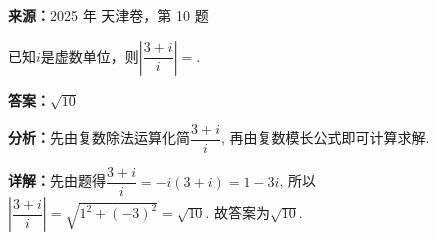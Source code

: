 \begin{question}[points=5]
\textbf{来源：}2025 年 天津卷，第 10 题\par
已知$i$是虚数单位，则$\left| \dfrac{3+i}{i} \right| = $.
\fillin[{$\sqrt{10}$}]
\begin{solution}
\textbf{答案：}$\sqrt{10}$

\textbf{分析：}先由复数除法运算化简$\dfrac{3+i}{i}$, 再由复数模长公式即可计算求解.

\textbf{详解：}先由题得$\dfrac{3+i}{i} = -i(3+i) = 1 - 3i$, 所以$\left| \dfrac{3+i}{i} \right| = \sqrt{1^2 + (-3)^2} = \sqrt{10}$. 故答案为$\sqrt{10}$.
\end{solution}
\end{question}

